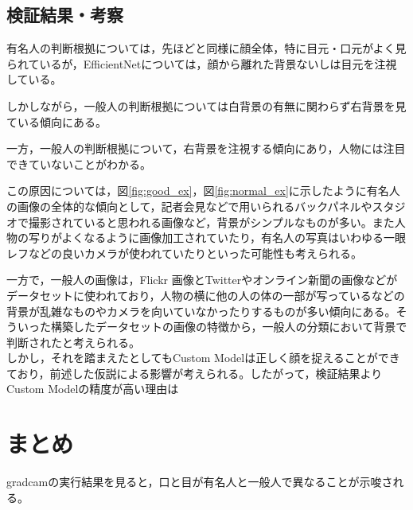 \documentclass[a4paper,11pt,titlepage]{jsarticle}
\begin{document}
\subsection{検証結果・考察}

有名人の判断根拠については，先ほどと同様に顔全体，特に目元・口元がよく見られているが，EfficientNetについては，顔から離れた背景ないしは目元を注視している。\par
しかしながら，一般人の判断根拠については白背景の有無に関わらず右背景を見ている傾向にある。

一方，一般人の判断根拠について，右背景を注視する傾向にあり，人物には注目できていないことがわかる。


この原因については，図\ref{fig:good_ex}，図\ref{fig:normal_ex}に示したように有名人の画像の全体的な傾向として，記者会見などで用いられるバックパネルやスタジオで撮影されていると思われる画像など，背景がシンプルなものが多い。また人物の写りがよくなるように画像加工されていたり，有名人の写真はいわゆる一眼レフなどの良いカメラが使われていたりといった可能性も考えられる。

一方で，一般人の画像は，Flickr 画像とTwitterやオンライン新聞の画像などがデータセットに使われており，人物の横に他の人の体の一部が写っているなどの背景が乱雑なものやカメラを向いていなかったりするものが多い傾向にある。そういった構築したデータセットの画像の特徴から，一般人の分類において背景で判断されたと考えられる。\\


しかし，それを踏まえたとしてもCustom Modelは正しく顔を捉えることができており，前述した仮説による影響が考えられる。したがって，検証結果よりCustom Modelの精度が高い理由は


\section{まとめ}


gradcamの実行結果を見ると，口と目が有名人と一般人で異なることが示唆される。
\end{document}
